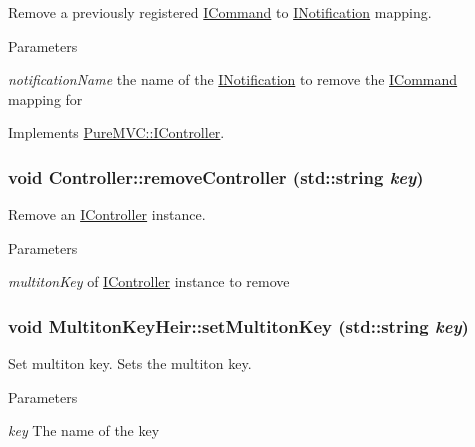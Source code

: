 Remove a previously registered {\ttfamily \hyperlink{class_pure_m_v_c_1_1_i_command}{ICommand}} to {\ttfamily \hyperlink{class_pure_m_v_c_1_1_i_notification}{INotification}} mapping. 
\begin{DoxyParams}{Parameters}
\item[{\em notificationName}]the name of the {\ttfamily \hyperlink{class_pure_m_v_c_1_1_i_notification}{INotification}} to remove the {\ttfamily \hyperlink{class_pure_m_v_c_1_1_i_command}{ICommand}} mapping for \end{DoxyParams}


Implements \hyperlink{class_pure_m_v_c_1_1_i_controller_a5d646a36a3d7fc08a0cefb17662ce8ef}{PureMVC::IController}.\hypertarget{class_pure_m_v_c_1_1_controller_a802f04dc749c8ddc8f0af2ed8db2e257}{
\subsubsection[{removeController}]{\setlength{\rightskip}{0pt plus 5cm}void Controller::removeController (std::string {\em key})}}
\label{class_pure_m_v_c_1_1_controller_a802f04dc749c8ddc8f0af2ed8db2e257}


Remove an \hyperlink{class_pure_m_v_c_1_1_i_controller}{IController} instance. 
\begin{DoxyParams}{Parameters}
\item[{\em multitonKey}]of \hyperlink{class_pure_m_v_c_1_1_i_controller}{IController} instance to remove \end{DoxyParams}
\hypertarget{class_pure_m_v_c_1_1_multiton_key_heir_abc70ef7c066bc8d7bf0196ec727599bb}{
\subsubsection[{setMultitonKey}]{\setlength{\rightskip}{0pt plus 5cm}void MultitonKeyHeir::setMultitonKey (std::string {\em key})}}
\label{class_pure_m_v_c_1_1_multiton_key_heir_abc70ef7c066bc8d7bf0196ec727599bb}


Set multiton key. Sets the multiton key. 
\begin{DoxyParams}{Parameters}
\item[{\em key}]The name of the key \end{DoxyParams}


